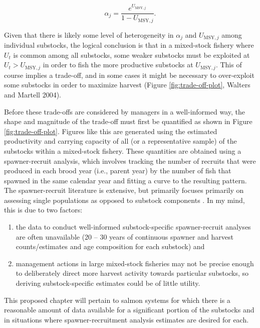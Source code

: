 \documentclass[12pt,]{book}
\theoremstyle{definition}
\theoremstyle{definition}
\theoremstyle{definition}
\theoremstyle{remark}
\begin{document}
\begin{equation}
  \alpha_j=\frac{e^{U_{\text{MSY},j}}}{1 - U_{\text{MSY},j}}.
  \label{eq:umsy-to-alpha}
\end{equation}

Given that there is likely some level of heterogeneity in \(\alpha_j\)
and \(U_{\text{MSY},j}\) among individual substocks, the logical
conclusion is that in a mixed-stock fishery where \(U_t\) is common
among all substocks, some weaker substocks must be exploited at
\(U_t > U_{\text{MSY},j}\) in order to fish the more productive
substocks at \(U_{\text{MSY},j}\). This of course implies a trade-off,
and in some cases it might be necessary to over-exploit some substocks
in order to maximize harvest (Figure \ref{fig:trade-off-plot}, Walters
and Martell 2004).

Before these trade-offs are considered by managers in a well-informed
way, the shape and magnitude of the trade-off must first be quantified
as shown in Figure \ref{fig:trade-off-plot}. Figures like this are
generated using the estimated productivity and carrying capacity of all
(or a representative sample) of the substocks within a mixed-stock
fishery. These quantities are obtained using a spawner-recruit analysis,
which involves tracking the number of recruits that were produced in
each brood year (i.e., parent year) by the number of fish that spawned
in the same calendar year and fitting a curve to the resulting pattern.
The spawner-recruit literature is extensive, but primarily focuses
primarily on assessing single populations as opposed to substock
components \citep[but see the work on Skeena River sockeye
substocks][]{walters-etal-2008, korman-english-2013}. In my mind, this
is due to two factors:

\begin{enumerate}
\def\labelenumi{(\arabic{enumi})}
\item
  the data to conduct well-informed substock-specific spawner-recruit
  analyses are often unavailable (20 -- 30 years of continuous spawner
  and harvest counts/estimates and age composition for each substock)
  and
\item
  management actions in large mixed-stock fisheries may not be precise
  enough to deliberately direct more harvest activity towards particular
  substocks, so deriving substock-specific estimates could be of little
  utility.
\end{enumerate}

\noindent
This proposed chapter will pertain to salmon systems for which there is
a reasonable amount of data available for a significant portion of the
substocks and in situations where spawner-recruitment analysis estimates
are desired for each.
\end{document}
